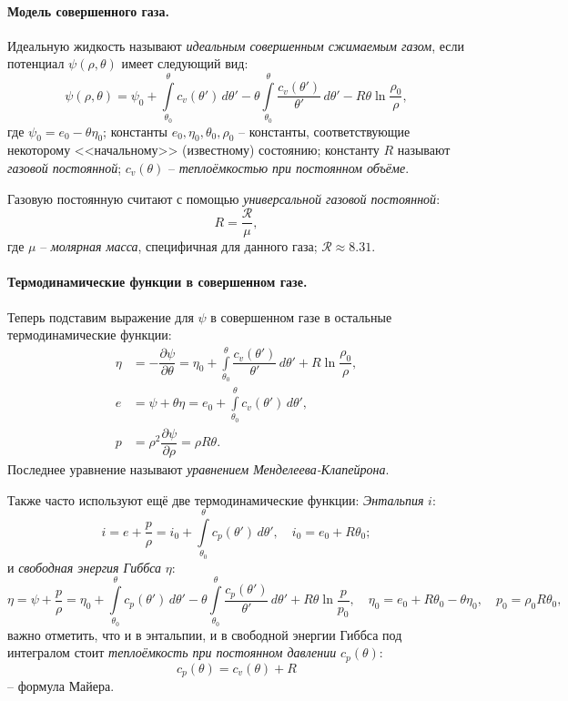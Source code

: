 
\paragraph{Модель совершенного газа.}
\begin{definition}
  Идеальную жидкость называют \emph{идеальным совершенным сжимаемым газом}, если потенциал
  $\psi(\rho, \theta)$ имеет следующий вид:
  \[
    \psi(\rho, \theta) = \psi_0 + \int\limits_{\theta_0}^\theta c_v(\theta') \, d\theta' -
    \theta \int\limits_{\theta_0}^\theta \dfrac{c_v(\theta')}{\theta'} \, d\theta' - R\theta \ln \dfrac{\rho_0}{\rho},
  \]
  где $\psi_0 = e_0 - \theta \eta_0$; константы $e_0, \eta_0, \theta_0, \rho_0$ -- константы,
  соответствующие некоторому <<начальному>> (известному) состоянию; константу $R$ называют
  \emph{газовой постоянной}; $c_v(\theta)$ -- \emph{теплоёмкостью при постоянном объёме}.
\end{definition}

Газовую постоянную считают с помощью \emph{универсальной газовой постоянной}:
\[
  R = \dfrac{\mathcal{R}}{\mu},
\]
где $\mu$ -- \emph{молярная масса}, специфичная для данного газа;
$\mathcal{R} \approx 8.31$.

\paragraph{Термодинамические функции в совершенном газе.}
Теперь подставим выражение для $\psi$ в совершенном газе в остальные термодинамические функции:
\begin{align*}
  \eta &= - \dfrac{\partial \psi}{\partial \theta} = \eta_0 + \int\limits_{\theta_0}^\theta \dfrac{c_v(\theta')}{\theta'} \, d\theta' + R \ln \dfrac{\rho_0}{\rho}, \\
  e &= \psi + \theta \eta = e_0 + \int\limits_{\theta_0}^\theta c_v(\theta') \, d\theta', \\
  p &= \rho^2 \dfrac{\partial \psi}{\partial \rho} = \rho R \theta.
\end{align*}
Последнее уравнение называют \emph{уравнением Менделеева-Клапейрона}.

Также часто используют ещё две термодинамические функции:
\emph{Энтальпия} $i$:
\[
  i = e + \dfrac{p}{\rho} = i_0 + \int\limits_{\theta_0}^\theta c_p(\theta') \, d\theta',
  \quad i_0 = e_0 + R\theta_0;
\]
и \emph{свободная энергия Гиббса} $\eta$:
\[
  \eta = \psi + \dfrac{p}{\rho} = \eta_0 + \int\limits_{\theta_0}^\theta c_p(\theta') \, d\theta' - \theta \int\limits_{\theta_0}^\theta \dfrac{c_p(\theta')}{\theta'} \, d\theta' + R\theta \ln \dfrac{p}{p_0}, \quad
  \eta_0 = e_0 + R\theta_0 - \theta \eta_0, \quad
  p_0 = \rho_0 R \theta_0,
\]
важно отметить, что и в энтальпии, и в свободной энергии Гиббса под интегралом стоит
\emph{теплоёмкость при постоянном давлении} $c_p(\theta)$:
\[
  c_p(\theta) = c_v(\theta) + R
\]
-- формула Майера.

